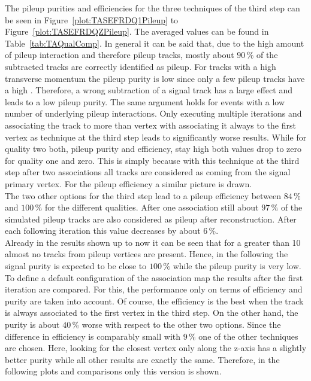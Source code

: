 The pileup purities and efficiencies for the three techniques of the third step can be seen in Figure~\ref{plot:TASEFRDQ1Pileup} to Figure~\ref{plot:TASEFRDQZPileup}. The averaged values can be found in Table~\ref{tab:TAQualComp}. In general it can be said that, due to the high amount of pileup interaction and therefore pileup tracks, mostly about $90\,\%$ of the subtracted tracks are correctly identified as pileup. For tracks with a high transverse momentum the pileup purity is low since only a few pileup tracks have a high \pt. Therefore, a wrong subtraction of a signal track has a large effect and leads to a low pileup purity. The same argument holds for events with a low number of underlying pileup interactions. Only executing multiple iterations and associating the track to more than vertex with associating it always to the first vertex as technique at the third step leads to significantly worse results. While for quality two both, pileup purity and efficiency, stay high both values drop to zero for quality one and zero. This is simply because with this technique at the third step after two associations all tracks are considered as coming from the signal primary vertex. For the pileup efficiency a similar picture is drawn. \\
The two other options for the third step lead to a pileup efficiency between $84\,\%$ and $100\,\%$ for the different qualities. After one association still about $97\,\%$ of the simulated pileup tracks are also considered as pileup after reconstruction. After each following iteration this value decreases by about $6\,\%$. \\
Already in the results shown up to now it can be seen that for a \pt{} greater than 10\GeV{} almost no tracks from pileup vertices are present. Hence, in the following the signal purity is expected to be close to $100\,\%$ while the pileup purity is very low. \\
To define a default configuration of the association map the results after the first iteration are compared. For this, the performance only on terms of efficiency and purity are taken into account. Of course, the efficiency is the best when the track is always associated to the first vertex in the third step. On the other hand, the purity is about $40\,\%$ worse with respect to the other two options. Since the difference in efficiency is comparably small with $9\,\%$ one of the other techniques are chosen. Here, looking for the closest vertex only along the z-axis has a slightly better purity while all other results are exactly the same. Therefore, in the following plots and comparisons only this version is shown.

